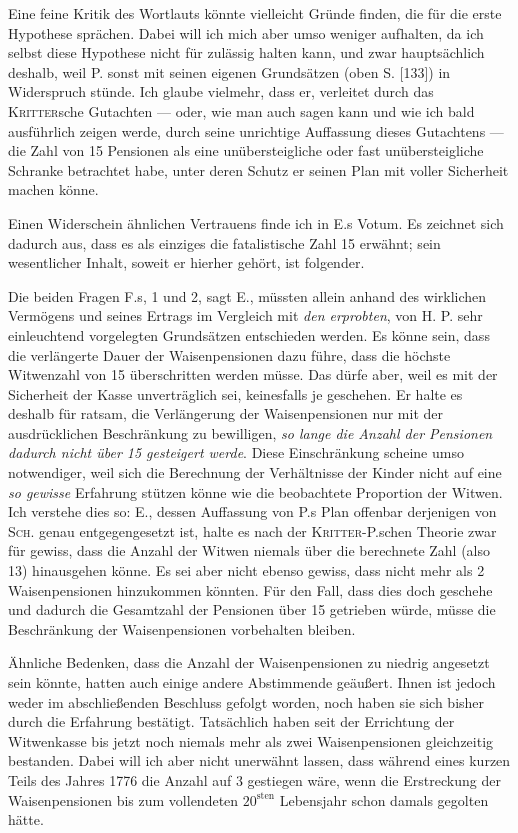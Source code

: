 \par{}
Eine feine Kritik des Wortlauts könnte vielleicht Gründe finden, die für die erste Hypothese sprächen. Dabei will ich mich aber umso weniger aufhalten, da ich selbst diese Hypothese nicht für zulässig halten kann, und zwar hauptsächlich deshalb, weil P. sonst mit seinen eigenen Grundsätzen (oben S. [133]) in Widerspruch stünde. Ich glaube vielmehr, dass er, verleitet durch das \textsc{Kritter}sche Gutachten — oder, wie man auch sagen kann und wie ich bald ausführlich zeigen werde, durch seine unrichtige Auffassung dieses Gutachtens — die Zahl von 15 Pensionen als eine unübersteigliche oder fast unübersteigliche Schranke betrachtet habe, unter deren Schutz er seinen Plan mit voller Sicherheit machen könne.

Einen Widerschein ähnlichen Vertrauens finde ich in E.s Votum. Es zeichnet sich dadurch aus, dass es als einziges die fatalistische Zahl 15 erwähnt; sein wesentlicher Inhalt, soweit er hierher gehört, ist folgender.

Die beiden Fragen F.s, 1 und 2, sagt E., müssten allein anhand des wirklichen Vermögens und seines Ertrags im Vergleich mit \textit{den erprobten}, von H. P. sehr einleuchtend vorgelegten Grundsätzen entschieden werden. Es könne sein, dass die verlängerte Dauer der Waisenpensionen dazu führe, dass die höchste Witwenzahl von 15 überschritten werden müsse. Das dürfe aber, weil es mit der Sicherheit der Kasse unverträglich sei, keinesfalls je geschehen. Er halte es deshalb für ratsam, die Verlängerung der Waisenpensionen nur mit der ausdrücklichen Beschränkung zu bewilligen, \textit{so lange die Anzahl der Pensionen dadurch nicht über 15 gesteigert werde}. Diese Einschränkung scheine umso notwendiger, weil sich die Berechnung der Verhältnisse der Kinder nicht auf eine \textit{so gewisse} Erfahrung stützen könne wie die beobachtete Proportion der Witwen. Ich verstehe dies so: E., dessen Auffassung von P.s Plan offenbar derjenigen von \textsc{Sch.} genau entgegengesetzt ist, halte es nach der \textsc{Kritter}-P.schen Theorie zwar für gewiss, dass die Anzahl der Witwen niemals über die berechnete Zahl (also 13) hinausgehen könne. Es sei aber nicht ebenso gewiss, dass nicht mehr als 2 Waisenpensionen hinzukommen könnten. Für den Fall, dass dies doch geschehe und dadurch die Gesamtzahl der Pensionen über 15 getrieben würde, müsse die Beschränkung der Waisenpensionen vorbehalten bleiben.

Ähnliche Bedenken, dass die Anzahl der Waisenpensionen zu niedrig angesetzt sein könnte, hatten auch einige andere Abstimmende geäußert. Ihnen ist jedoch weder im abschließenden Beschluss gefolgt worden, noch haben sie sich bisher durch die Erfahrung bestätigt. Tatsächlich haben seit der Errichtung der Witwenkasse bis jetzt noch niemals mehr als zwei Waisenpensionen gleichzeitig bestanden. Dabei will ich aber nicht unerwähnt lassen, dass während eines kurzen Teils des Jahres 1776 die Anzahl auf 3 gestiegen wäre, wenn die Erstreckung der Waisenpensionen bis zum vollendeten \(20^{\text{sten}}\) Lebensjahr schon damals gegolten hätte.

